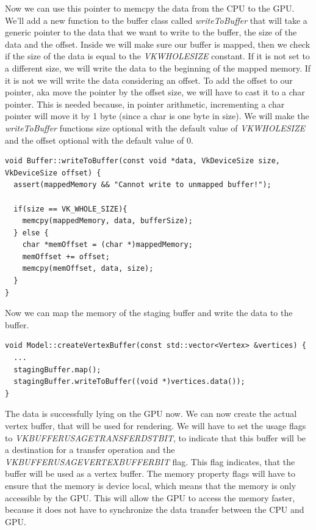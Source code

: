 \documentclass[12pt]{report} \usepackage{preamble}
\begin{document}
Now we can use this pointer to memcpy the data from the CPU to the GPU.
We'll add a new function to the buffer class called \textit{writeToBuffer} that will take a generic pointer to the data that we want to write to the buffer, the size of the data and the offset.
Inside we will make sure our buffer is mapped, then we check if the size of the data is equal to the \textit{VK\textunderscore WHOLE\textunderscore SIZE} constant.
If it is not set to a different size, we will write the data to the beginning of the mapped memory.
If it is not we will write the data considering an offset. To add the offset to our pointer, aka move the pointer by the offset size, we will have to cast it to a char pointer.
This is needed because, in pointer arithmetic, incrementing a char pointer will move it by 1 byte (since a char is one byte in size).
We will make the \textit{writeToBuffer} functions size optional with
the default value of \textit{VK\textunderscore WHOLE\textunderscore SIZE} and the offset optional with the default value of 0.

\begin{lstlisting}[Language=C++]
void Buffer::writeToBuffer(const void *data, VkDeviceSize size, VkDeviceSize offset) {
  assert(mappedMemory && "Cannot write to unmapped buffer!");

  if(size == VK_WHOLE_SIZE){
    memcpy(mappedMemory, data, bufferSize);
  } else {
    char *memOffset = (char *)mappedMemory;
    memOffset += offset;
    memcpy(memOffset, data, size);
  }
}
\end{lstlisting}

Now we can map the memory of the staging buffer and write the data to the buffer.

\begin{lstlisting}[Language=C++]
void Model::createVertexBuffer(const std::vector<Vertex> &vertices) {
  ...
  stagingBuffer.map();
  stagingBuffer.writeToBuffer((void *)vertices.data());
}
\end{lstlisting}

The data is successfully lying on the GPU now. We can now create the actual vertex buffer, that will be used for rendering.
We will have to set the usage flags to \textit{VK\textunderscore BUFFER\textunderscore USAGE\textunderscore TRANSFER\textunderscore DST\textunderscore BIT}, to
indicate that this buffer will be a destination for a transfer operation and the \\
\textit{VK\textunderscore BUFFER\textunderscore USAGE\textunderscore VERTEX\textunderscore BUFFER\textunderscore BIT}
flag. This flag indicates, that the buffer will be used as a vertex buffer. The memory property flags will have to ensure that the memory is device local,
which means that the memory is only accessible by the GPU. This will allow the GPU to access the memory faster, because it does not have to synchronize the data transfer between the CPU and GPU.
\end{document}
